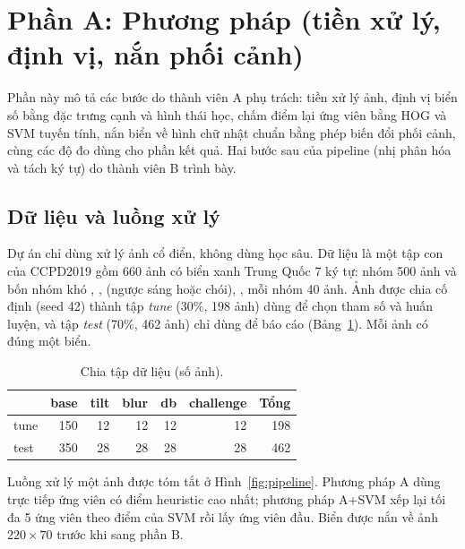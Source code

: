 \section{Phần A: Phương pháp (tiền xử lý, định vị, nắn phối cảnh)}
\label{sec:a-method}

Phần này mô tả các bước do thành viên A phụ trách: tiền xử lý ảnh, định vị biển số bằng đặc trưng cạnh và hình thái học, chấm điểm lại ứng viên bằng HOG và SVM tuyến tính, nắn biển về hình chữ nhật chuẩn bằng phép biến đổi phối cảnh, cùng các độ đo dùng cho phần kết quả. Hai bước sau của pipeline (nhị phân hóa và tách ký tự) do thành viên B trình bày.

\subsection{Dữ liệu và luồng xử lý}

Dự án chỉ dùng xử lý ảnh cổ điển, không dùng học sâu. Dữ liệu là một tập con của CCPD2019 gồm 660 ảnh có biển xanh Trung Quốc 7 ký tự: nhóm  500 ảnh và bốn nhóm khó , ,  (ngược sáng hoặc chói), , mỗi nhóm 40 ảnh. Ảnh được chia cố định (seed 42) thành tập \emph{tune} (30\%, 198 ảnh) dùng để chọn tham số và huấn luyện, và tập \emph{test} (70\%, 462 ảnh) chỉ dùng để báo cáo (Bảng~\ref{tab:split}). Mỗi ảnh có đúng một biển.

\begin{table}[htbp]
\centering
\caption{Chia tập dữ liệu (số ảnh).}
\label{tab:split}
\small
\begin{tabular}{lrrrrrr}
\toprule
 & base & tilt & blur & db & challenge & Tổng \\
\midrule
tune & 150 & 12 & 12 & 12 & 12 & 198 \\
test & 350 & 28 & 28 & 28 & 28 & 462 \\
\bottomrule
\end{tabular}
\end{table}

Luồng xử lý một ảnh được tóm tắt ở Hình~\ref{fig:pipeline}. Phương pháp A dùng trực tiếp ứng viên có điểm heuristic cao nhất; phương pháp A+SVM xếp lại tối đa 5 ứng viên theo điểm của SVM rồi lấy ứng viên đầu. Biển được nắn về ảnh $220\times 70$ trước khi sang phần B.

